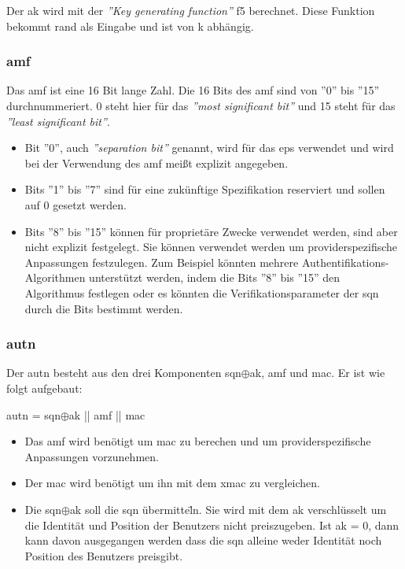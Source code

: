 Der \gls{ak} wird mit der \textit{''Key generating function''} f5 berechnet. Diese Funktion bekommt \gls{rand} als Eingabe und ist von \gls{k} abh\"angig. %

\subsubsection{\gls{amf}}
Das \gls{amf} ist eine 16 Bit lange Zahl. %
Die 16 Bits des \gls{amf} sind von ''0'' bis ''15'' durchnummeriert. %
0 steht hier f\"ur das \textit{''most significant bit''} und 15 steht f\"ur das \textit{''least significant bit''}.

\begin{itemize}
\item Bit ''0'', auch \textit{''separation bit''} genannt, wird f\"ur das \gls{eps} verwendet und wird bei der Verwendung des \gls{amf} mei{\ss}t explizit angegeben. \\
\item Bits ''1'' bis ''7'' sind f\"ur eine zuk\"unftige Spezifikation reserviert und sollen auf 0 gesetzt werden. \\
\item Bits ''8'' bis ''15'' k\"onnen f\"ur propriet\"are Zwecke verwendet werden, sind aber nicht explizit festgelegt. 
Sie k\"onnen verwendet werden um providerspezifische Anpassungen festzulegen.
Zum Beispiel k\"onnten mehrere Authentifikations-Algorithmen unterst\"utzt werden, indem die Bits ''8'' bis ''15'' den Algorithmus festlegen oder es k\"onnten die Verifikationsparameter der \gls{sqn} durch die Bits bestimmt werden. %
\end{itemize}

\subsubsection{\gls{autn}}
Der \gls{autn} besteht aus den drei Komponenten \gls{sqn}$ \oplus $\gls{ak}, \gls{amf} und \gls{mac}. 
Er ist wie folgt aufgebaut: %

\gls{autn} = \gls{sqn}$ \oplus $\gls{ak} || \gls{amf} || \gls{mac}

\begin{itemize}
\item Das \gls{amf} wird ben\"otigt um \gls{mac} zu berechen und um providerspezifische Anpassungen vorzunehmen.
\item Der \gls{mac} wird ben\"otigt um ihn mit dem \gls{xmac} zu vergleichen.
\item Die \gls{sqn}$ \oplus $\gls{ak} soll die \gls{sqn} \"ubermitte\"ln.
Sie wird mit dem \gls{ak} verschl\"usselt um die Identit\"at und Position der Benutzers nicht preiszugeben.
Ist \gls{ak} = 0, dann kann davon ausgegangen werden dass die \gls{sqn} alleine weder Identit\"at noch Position des Benutzers preisgibt.
\end{itemize}

